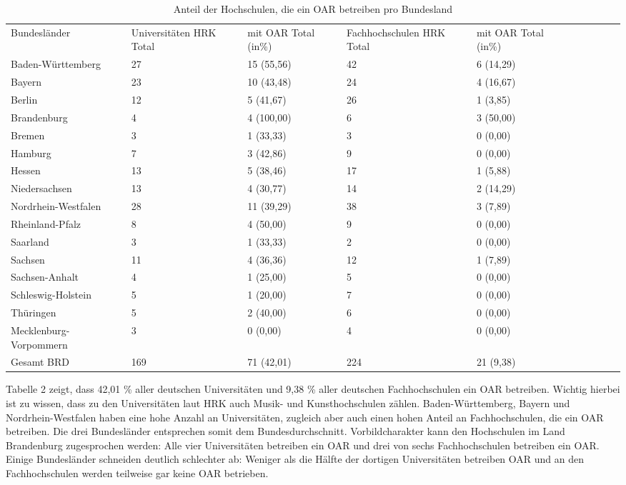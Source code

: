 \documentclass[a4paper,
fontsize=11pt,
oneside,
numbers=noperiodatend,
parskip=half-,
bibliography=totoc,
final
]{scrartcl}
\begin{document}
\begin{table}[ht]
\small
\centering
\begin{tabular}{p{4cm}p{2.5cm}p{2.5cm}p{2.5cm}p{2.5cm} lrrrr}
  \toprule
  Bundesländer & Universitäten HRK Total  & mit OAR Total (in\%)  & Fachhochschulen HRK Total  & mit OAR Total (in\%) \\ 
\cmidrule(r){1-1} \cmidrule(r){2-2} \cmidrule(r){3-3} \cmidrule(r){4-4} \cmidrule(r){5-5}
  Baden-Württemberg &  27 & 15 (55,56) &  42 & 6 (14,29) \\ 
  Bayern &  23 & 10 (43,48) &  24 & 4 (16,67) \\ 
  Berlin &  12 & 5 (41,67) &  26 & 1 (3,85) \\ 
  Brandenburg &   4 & 4 (100,00) &   6 & 3 (50,00) \\ 
  Bremen &   3 & 1 (33,33) &   3 & 0 (0,00) \\ 
  Hamburg &   7 & 3 (42,86) &   9 & 0 (0,00) \\ 
  Hessen &  13 & 5 (38,46) &  17 & 1 (5,88) \\ 
  Niedersachsen &  13 & 4 (30,77) &  14 & 2 (14,29) \\ 
  Nordrhein-Westfalen &  28 & 11 (39,29) &  38 & 3 (7,89) \\ 
  Rheinland-Pfalz &   8 & 4 (50,00) &   9 & 0 (0,00) \\ 
  Saarland &   3 & 1 (33,33) &   2 & 0 (0,00) \\ 
  Sachsen &  11 & 4 (36,36) &  12 & 1 (7,89) \\ 
  Sachsen-Anhalt &   4 & 1 (25,00) &   5 & 0 (0,00) \\ 
  Schleswig-Holstein &   5 & 1 (20,00) &   7 & 0 (0,00) \\ 
  Thüringen &   5 & 2 (40,00) &   6 & 0 (0,00) \\ 
  Mecklenburg-Vorpommern &   3 & 0 (0,00) &   4 & 0 (0,00) \\
  \cmidrule(r){1-1} \cmidrule(r){2-2} \cmidrule(r){3-3} \cmidrule(r){4-4} \cmidrule(r){5-5} 
  Gesamt BRD & 169 & 71 (42,01) & 224 & 21 (9,38) \\ 
   \bottomrule
\end{tabular}
\caption{Anteil der Hochschulen, die ein OAR betreiben pro Bundesland}
\end{table}


Tabelle 2 zeigt, dass 42,01 \% aller deutschen Universitäten und 9,38 \%
aller deutschen Fachhochschulen ein OAR betreiben. Wichtig hierbei ist
zu wissen, dass zu den Universitäten laut HRK auch Musik- und
Kunsthochschulen zählen. Baden-Württemberg, Bayern und
Nordrhein-Westfalen haben eine hohe Anzahl an Universitäten, zugleich
aber auch einen hohen Anteil an Fachhochschulen, die ein OAR betreiben.
Die drei Bundesländer entsprechen somit dem Bundesdurchschnitt.
Vorbildcharakter kann den Hochschulen im Land Brandenburg zugesprochen
werden: Alle vier Universitäten betreiben ein OAR und drei von sechs
Fachhochschulen betreiben ein OAR. Einige Bundesländer schneiden
deutlich schlechter ab: Weniger als die Hälfte der dortigen
Universitäten betreiben OAR und an den Fachhochschulen werden teilweise
gar keine OAR betrieben.
\end{document}
